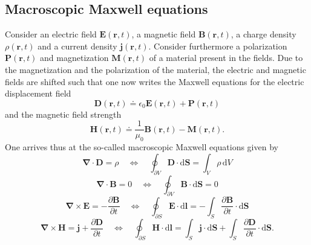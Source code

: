 \documentclass{report}
\numberwithin{tm}{section}
\newcommand\vect[1]{\ensuremath{\bm{#1}}}
\begin{document}
	\subsection{Macroscopic Maxwell equations}
	Consider an electric field $\vect{E}(\vect{r},t)$, a magnetic field $\vect{B}(\vect{r},t)$, a charge density $\rho(\vect{r},t)$ and a current density $\vect{j}(\vect{r},t)$. Consider furthermore a polarization $\vect{P}(\vect{r},t)$ and magnetization $\vect{M}(\vect{r},t)$ of a material present in the fields. Due to the magnetization and the polarization of the material, the electric and magnetic fields are shifted such that one now writes the Maxwell equations for the electric displacement field \begin{equation}
		\vect{D}(\vect{r},t) \doteq \epsilon_0\vect{E}(\vect{r},t) + \vect{P}(\vect{r},t)
	\end{equation} and the magnetic field strength \begin{equation}
	\vect{H}(\vect{r},t) \doteq \frac{1}{\mu_0}\vect{B}(\vect{r},t) - \vect{M}(\vect{r},t).
	\end{equation} One arrives thus at the so-called macroscopic Maxwell equations given by \begin{equation}
	\vect{\nabla}\cdot \vect{D} = \rho \quad \Leftrightarrow \quad \oint_{\partial V} \vect{D}\cdot \mathrm{d}\vect{S} = \int_{V}\rho\,\mathrm{d}V
	\end{equation}
	\begin{equation}
	\vect{\nabla}\cdot \vect{B} = 0 \quad \Leftrightarrow \quad \oint_{\partial V}\vect{B}\cdot \mathrm{d}\vect{S} = 0
	\end{equation}
	\begin{equation}
	\vect{\nabla} \times \vect{E} = - \frac{\partial \vect{B}}{\partial t} \quad \Leftrightarrow \quad \oint_{\partial S}\vect{E}\cdot \mathrm{d}\vect{l} = -\int_{S}\frac{\partial \vect{B}}{\partial t}\cdot \mathrm{d}\vect{S}
	\end{equation}
	\begin{equation}
	\vect{\nabla} \times \vect{H} = \vect{j} + \frac{\partial \vect{D}}{\partial t} \quad \Leftrightarrow \quad \oint_{\partial S}\vect{H}\cdot \mathrm{d}\vect{l} = \int_{S}\vect{j}\cdot \mathrm{d}\vect{S} + \int_{S}\frac{\partial \vect{D}}{\partial t}\cdot \mathrm{d}\vect{S}.
	\end{equation}
	
\end{document}
